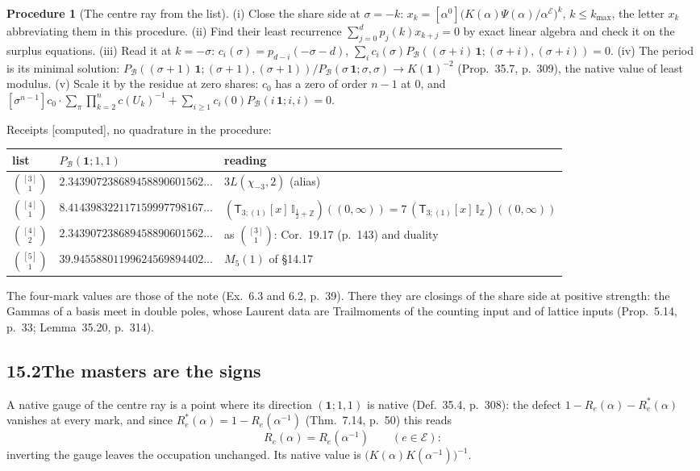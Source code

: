\documentclass[11pt]{article}
\newcommand{\cE}{\mathcal E}
\newcommand{\cB}{\mathcal B}
\newcommand{\one}{\mathbf 1}
\newcommand{\sT}{\mathsf T}
\newcommand{\IZ}{\mathbb I_{\mathbb Z}}
\newcommand{\Ilat}[1]{\mathbb I_{#1}}
\newcommand{\Tx}[3]{(\sT_{#1;(1)}[x]\,#2)((#3,\infty))}
\newcommand{\Pc}[1]{P_{\cB}(#1\,\one;#1,#1)}
\newcommand{\Clo}[1]{[\alpha^0]\big(K(\alpha)\Psi(\alpha)/\alpha^{\cE}\big)^{#1}}
\newcommand{\Cor}{\sum_\pi\prod_{k=2}^nc(U_k)^{-1}}
\theoremstyle{plain}
\theoremstyle{definition}
\newtheorem{procedure}[proposition]{Procedure}
\theoremstyle{remark}
\newcommand{\computed}{\textup{[computed]}}
\begin{document}
\begin{procedure}[The centre ray from the list]\label{p:proc}
(i) Close the share side at $\sigma=-k$: $x_k=\Clo k$, $k\le k_{\max}$, the letter $x_k$ abbreviating them in this procedure. (ii) Find their least recurrence $\sum_{j=0}^dp_j(k)x_{k+j}=0$ by exact linear algebra and check it on the surplus equations. (iii) Read it at $k=-\sigma$: $c_i(\sigma)=p_{d-i}(-\sigma-d)$, $\sum_ic_i(\sigma)\Pc{(\sigma+i)}=0$. (iv) The period is its minimal solution: $\Pc{(\sigma+1)}/\Pc\sigma\to K(\one)^{-2}$ (Prop.~35.7, p.~309), the native value of least modulus. (v) Scale it by the residue at zero shares: $c_0$ has a zero of order $n-1$ at $0$, and $[\sigma^{n-1}]c_0\cdot\Cor+\sum_{i\ge1}c_i(0)\Pc i=0$.
\end{procedure}

\noindent Receipts \computed, no quadrature in the procedure:
\begin{center}
\begin{tabular}{lll}
\toprule
list & $P_{\cB}(\one;1,1)$ & reading\\ \midrule
$\binom{[3]}1$ & $2.343907238689458890601562\ldots$ & $3L(\chi_{-3},2)$ (alias)\\
$\binom{[4]}1$ & $8.414398322117159997798167\ldots$ & $\Tx{3}{\Ilat{\frac12+\mathbb Z}}{0}=7\,\Tx{3}{\IZ}{0}$\\
$\binom{[4]}2$ & $2.343907238689458890601562\ldots$ & as $\binom{[3]}1$: Cor.~19.17 (p.~143) and duality\\
$\binom{[5]}1$ & $39.94558801199624569894402\ldots$ & $M_5(1)$ of \S14.17\\
\bottomrule
\end{tabular}
\end{center}
The four-mark values are those of the note (Ex.~6.3 and 6.2, p.~39). There they are closings of the share side at positive strength: the Gammas of a basis meet in double poles, whose Laurent data are Trailmoments of the counting input and of lattice inputs (Prop.~5.14, p.~33; Lemma~35.20, p.~314).

\subsection*{15.2\quad The masters are the signs}

A native gauge of the centre ray is a point where its direction $(\one;1,1)$ is native (Def.~35.4, p.~308): the defect $1-R_e(\alpha)-R^\ast_e(\alpha)$ vanishes at every mark, and since $R^\ast_e(\alpha)=1-R_e(\alpha^{-1})$ (Thm.~7.14, p.~50) this reads
\[
R_e(\alpha)=R_e(\alpha^{-1})\qquad(e\in\cE):
\]
inverting the gauge leaves the occupation unchanged. Its native value is $\big(K(\alpha)K(\alpha^{-1})\big)^{-1}$.
\end{document}

